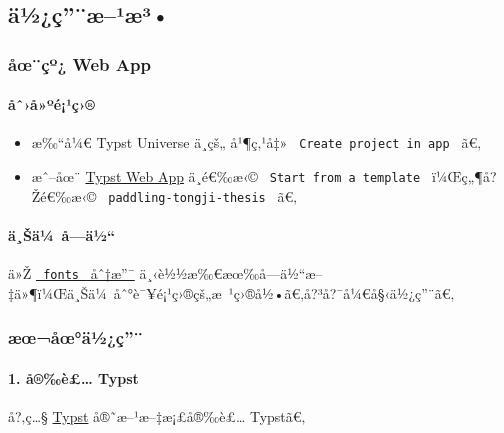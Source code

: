 \subsection{ä½¿ç''¨æ--¹æ³•}\label{uxe4uxbduxe7uxe6uxb9uxe6uxb3}

\subsubsection{åœ¨çº¿ Web App}\label{uxe5ux153uxe7uxba-web-app}

\paragraph{åˆ›å»ºé¡¹ç›®}\label{uxe5ux2c6uxe5uxbauxe9uxb9uxe7}

\begin{itemize}
\item
  æ‰``å¼€ Typst Universe ä¸­çš„
  \href{https://www.overleaf.com/latex/templates/tongji-university-undergraduate-thesis-template/tfvdvyggqybn}{}
  å¹¶ç‚¹å‡» \texttt{\ Create\ project\ in\ app\ } ã€‚
\item
  æˆ--åœ¨ \href{https://typst.app/}{Typst Web App} ä¸­é€‰æ‹©
  \texttt{\ Start\ from\ a\ template\ } ï¼Œç„¶å?Žé€‰æ‹©
  \texttt{\ paddling-tongji-thesis\ } ã€‚
\end{itemize}

\paragraph{ä¸Šä¼~å­---ä½``}\label{uxe4ux161uxe4uxbc-uxe5uxe4uxbd}

ä»Ž
\href{https://github.com/TJ-CSCCG/tongji-undergrad-thesis-typst/tree/fonts}{\texttt{\ fonts\ }
åˆ†æ''¯}
ä¸‹è½½æ‰€æœ‰å­---ä½``æ--‡ä»¶ï¼Œä¸Šä¼~åˆ°è¯¥é¡¹ç›®çš„æ~¹ç›®å½•ã€‚å?³å?¯å¼€å§‹ä½¿ç''¨ã€‚

\subsubsection{æœ¬åœ°ä½¿ç''¨}\label{uxe6ux153uxe5ux153uxe4uxbduxe7}

\paragraph{1. å®‰è£\ldots{} Typst}\label{uxe5uxe8-typst}

å?‚ç\ldots§
\href{https://github.com/typst/typst?tab=readme-ov-file\#installation}{Typst}
å®˜æ--¹æ--‡æ¡£å®‰è£\ldots{} Typstã€‚

